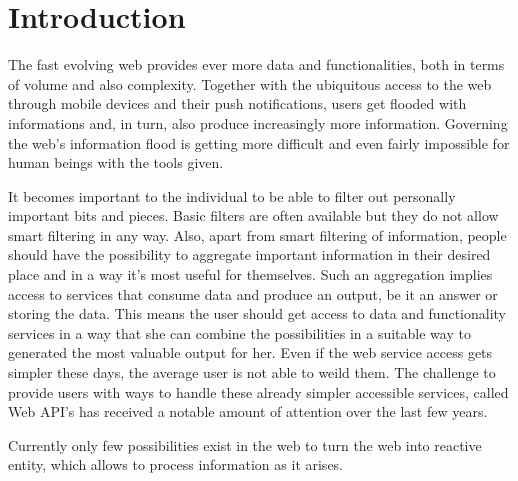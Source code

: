 \chapter{Introduction}
The fast evolving web provides ever more data and functionalities, both in terms of volume and also complexity.
Together with the ubiquitous access to the web through mobile devices and their push notifications, users get flooded with informations and, in turn, also produce increasingly more information.
Governing the web's information flood is getting more difficult and even fairly impossible for human beings with the tools given.


It becomes important to the individual to be able to filter out personally important bits and pieces.
Basic filters are often available but they do not allow smart filtering in any way.
Also, apart from smart filtering of information, people should have the possibility to aggregate important information in their desired place and in a way it's most useful for themselves.
Such an aggregation implies access to services that consume data and produce an output, be it an answer or storing the data.
This means the user should get access to data and functionality services in a way that she can combine the possibilities in a suitable way to generated the most valuable output for her.
Even if the web service access gets simpler these days, the average user is not able to weild them.
The challenge to provide users with ways to handle these already simpler accessible services, called Web API's has received a notable amount of attention over the last few years.






Currently only few possibilities exist in the web to turn the web into reactive entity, which allows to process information as it arises.
